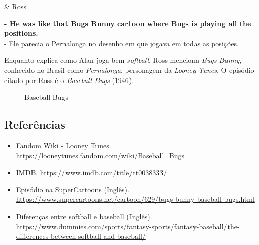 \begin{tcolorbox}[enhanced,center upper,
    drop fuzzy shadow southeast, boxrule=0.3pt,
    lower separated=false,
    colframe=black!30!dialogoBorder,colback=white]
\begin{minipage}[c]{0.16\linewidth}
   & \centering \scriptsize{Ross}
\end{minipage}
\hfill
\begin{minipage}[c]{0.8\linewidth}
  \textbf{- He was like that Bugs Bunny cartoon where Bugs is playing all the positions.}\\
  - Ele parecia o Pernalonga no desenho em que jogava em todas as posições.
\end{minipage}
\end{tcolorbox}

Enquanto explica como Alan joga bem \emph{softball}, Ross menciona
\emph{Bugs Bunny}, conhecido no Brasil como \emph{Pernalonga},
personagem da \emph{Looney Tunes}. O episódio citado por Ross é o
\emph{Baseball Bugs} (1946).

\begin{figure}
  \centering
    \caption{Baseball Bugs\label{fig:baseball-bugs}}
\end{figure}

\hypertarget{referuxeancias-4}{%
\subsection{Referências}\label{referuxeancias-4}}

\begin{itemize}
\tightlist
\item
  \sloppy Fandom Wiki - Looney Tunes. \url{https://looneytunes.fandom.com/wiki/Baseball_Bugs}
\item
  \sloppy IMDB. \url{https://www.imdb.com/title/tt0038333/}
\item
  \sloppy Episódio na SuperCartoons (Inglês). \url{https://www.supercartoons.net/cartoon/629/bugs-bunny-baseball-bugs.html}
\item
  \sloppy Diferenças entre softball e baseball (Inglês). \url{https://www.dummies.com/sports/fantasy-sports/fantasy-baseball/the-differences-between-softball-and-baseball/}
\end{itemize}

